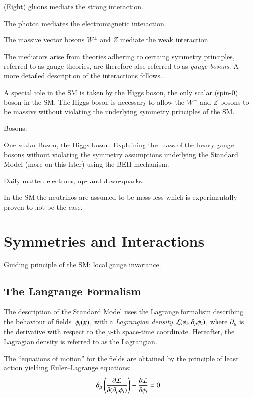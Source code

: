(Eight) gluons mediate the strong interaction.

The photon mediates the electromagnetic interaction.

The massive vector bosons $W^\pm$ and $Z$ mediate the weak interaction.

The mediators arise from theories adhering to certaing symmetry principles,
referred to as gauge theories, are therefore also referred to as \emph{gauge
  bosons}. A more detailed description of the interactions follows...

A special role in the SM is taken by the Higgs boson, the only scalar (spin-0)
boson in the SM. The Higgs boson is necessary to allow the $W^\pm$ and $Z$
bosons to be massive without violating the underlying symmetry principles of the
SM.

Bosons:

One scalar Boson, the Higgs boson. Explaining the mass of the heavy gauge bosons
without violating the symmetry assumptions underlying the Standard Model (more
on this later) using the BEH-mechanism.


Daily matter: electrons, up- and down-quarks.


In the SM the neutrinos are assumed to be mass-less which is experimentally
proven to not be the case.


\section{Symmetries and Interactions}

Guiding principle of the SM: local gauge invariance.


\subsection{The Langrange Formalism}

The description of the Standard Model uses the Lagrange formalism describing the
behaviour of fields, $\phi_i(\myvec{x})$, with a \emph{Lagrangian density}
$\mathcal{L}(\phi_i, \partial_\mu \phi_i)$, where $\partial_\mu$ is the derivative
with respect to the $\mu$-th space-time coordinate. Hereafter, the Lagragian
density is referred to as the Lagrangian.

The ``equations of motion'' for the fields are obtained by the principle of
least action yielding Euler--Lagrange equations:
\begin{align*}
  \partial_{\mu} \left( \frac{\partial \mathcal{L}}{\partial (\partial_{\mu} \phi_i)} \right) - \frac{\partial \mathcal{L}}{\partial \phi_i} = 0
\end{align*}

